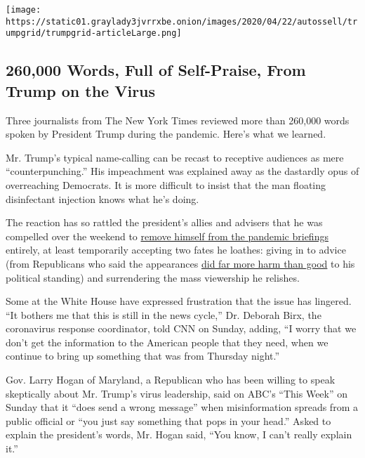 \href{https://www.nytimes3xbfgragh.onion/interactive/2020/04/26/us/politics/trump-coronavirus-briefings-analyzed.html}{}

\texttt{[image: https://static01.graylady3jvrrxbe.onion/images/2020/04/22/autossell/trumpgrid/trumpgrid-articleLarge.png]}

\hypertarget{260000-words-full-of-self-praise-from-trump-on-the-virus}{%
\subsection{260,000 Words, Full of Self-Praise, From Trump on the
Virus}\label{260000-words-full-of-self-praise-from-trump-on-the-virus}}

Three journalists from The New York Times reviewed more than 260,000
words spoken by President Trump during the pandemic. Here's what we
learned.

Mr. Trump's typical name-calling can be recast to receptive audiences as
mere ``counterpunching.'' His impeachment was explained away as the
dastardly opus of overreaching Democrats. It is more difficult to insist
that the man floating disinfectant injection knows what he's doing.

The reaction has so rattled the president's allies and advisers that he
was compelled over the weekend to
\href{https://www.nytimes3xbfgragh.onion/2020/04/25/us/coronavirus-news.html}{remove
himself from the pandemic briefings} entirely, at least temporarily
accepting two fates he loathes: giving in to advice (from Republicans
who said the appearances
\href{https://www.nytimes3xbfgragh.onion/2020/04/25/us/politics/trump-election-briefings.html}{did
far more harm than good} to his political standing) and surrendering the
mass viewership he relishes.

Some at the White House have expressed frustration that the issue has
lingered. ``It bothers me that this is still in the news cycle,'' Dr.
Deborah Birx, the coronavirus response coordinator, told CNN on Sunday,
adding, ``I worry that we don't get the information to the American
people that they need, when we continue to bring up something that was
from Thursday night.''

Gov. Larry Hogan of Maryland, a Republican who has been willing to speak
skeptically about Mr. Trump's virus leadership, said on ABC's ``This
Week'' on Sunday that it ``does send a wrong message'' when
misinformation spreads from a public official or ``you just say
something that pops in your head.'' Asked to explain the president's
words, Mr. Hogan said, ``You know, I can't really explain it.''

